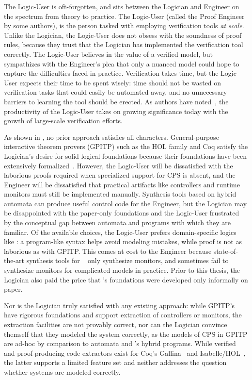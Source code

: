 \documentclass[12pt]{cmuthesis}
\theoremstyle{definition}
\theoremstyle{remark}
\newcommand{\rref}[2][]{\prettyref{#2}}
\newcommand{\Isabelle}{Isabelle/HOL\xspace}
\newcommand{\Coq}{Coq\xspace}
\begin{document}
The Logic-User is oft-forgotten, and sits between the Logician and Engineer on the spectrum from theory to practice.
The Logic-User (called the Proof Engineer by some authors), is the person tasked with employing verification tools \emph{at scale}.
Unlike the Logician, the Logic-User does not obsess with the soundness of proof rules, because they trust that the Logician has implemented the verification tool correctly.
The Logic-User believes in the value of a verified model, but sympathizes with the Engineer's plea that only a nuanced model could hope to capture the difficulties faced in practice.
Verification takes time, but the Logic-User expects their time to be spent wisely: time should not be wasted on verification tasks that could easily be automated away, and no unnecessary barriers to learning the tool should be erected.
As authors have noted~\cite{ringer2019qed}, the productivity of the Logic-User takes on growing significance today with the growth of large-scale verification efforts.

As shown in \rref{tab:approach-comparison}, no prior approach satisfies all characters.
General-purpose interactive theorem provers (GPITP) such as the HOL family and \Coq satisfy the Logician's desire for solid logical foundations because their foundations have been extensively formalized~\cite{DBLP:journals/jfrea/Barras10,DBLP:journals/jar/KumarAMO16}.
However, the Logic-User will be dissatisfied with the laborious proofs required when specialized support for CPS is absent,
and the Engineer will be dissatisfied that practical artifacts like controllers and runtime monitors must still be implemented manually.
Synthesis tools based on hybrid automata can produce useful control code for the Engineer, but the Logician may be disappointed with the paper-only foundations and the Logic-User frustrated by the conceptual gap between automata and programs with which they are familiar.
Of the available choices, the Logic-User prefers domain-specific logics like \dL: a program-like syntax helps avoid modeling mistakes, while proof is not as laborious as with GPITP.
This comes at cost to the Engineer because state-of-the-art synthesis tools for \dL~\cite{DBLP:journals/fmsd/MitschP16} only synthesize monitors, and sometimes fail to synthesize monitors for complicated models in practice.
Prior to this thesis, the Logician also paid the price that \dL's foundations were developed only informally on paper.

Nor is the Logician truly satisfied with any existing approach: while GPITP's have rigorous foundations and support extraction of controllers or monitors, the extraction facilities are not provably correct, nor can the Logician convince themself that they modeled the system correctly, as the models of CPS in GPITP are ad-hoc by comparison to automata and \dL's hybrid programs.
While verified and proof-producing code extractors exist for Coq's Gallina~\cite{DBLP:conf/cpp/MullenPWTG18,anand2017certicoq,DBLP:conf/nfm/IoannidisKZ19} and \Isabelle~\cite{DBLP:conf/esop/HupelN18}, the latter supports a limited feature set and neither addresses the question whether systems are modeled correctly.
\end{document}
